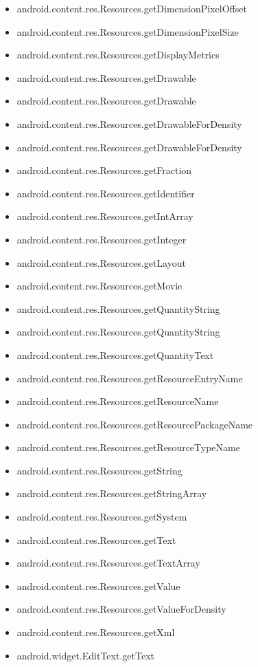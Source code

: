 \documentclass{sig-alternate}
\begin{document}
\begin{itemize}
\item android.content.res.Resources.getDimensionPixelOffset
\item android.content.res.Resources.getDimensionPixelSize
\item android.content.res.Resources.getDisplayMetrics
\item android.content.res.Resources.getDrawable
\item android.content.res.Resources.getDrawable
\item android.content.res.Resources.getDrawableForDensity
\item android.content.res.Resources.getDrawableForDensity
\item android.content.res.Resources.getFraction
\item android.content.res.Resources.getIdentifier
\item android.content.res.Resources.getIntArray
\item android.content.res.Resources.getInteger
\item android.content.res.Resources.getLayout
\item android.content.res.Resources.getMovie
\item android.content.res.Resources.getQuantityString
\item android.content.res.Resources.getQuantityString
\item android.content.res.Resources.getQuantityText
\item android.content.res.Resources.getResourceEntryName
\item android.content.res.Resources.getResourceName
\item android.content.res.Resources.getResourcePackageName
\item android.content.res.Resources.getResourceTypeName
\item android.content.res.Resources.getString
\item android.content.res.Resources.getStringArray
\item android.content.res.Resources.getSystem
\item android.content.res.Resources.getText
\item android.content.res.Resources.getTextArray
\item android.content.res.Resources.getValue
\item android.content.res.Resources.getValueForDensity
\item android.content.res.Resources.getXml
\item android.widget.EditText.getText

\end{itemize}
\end{document}

